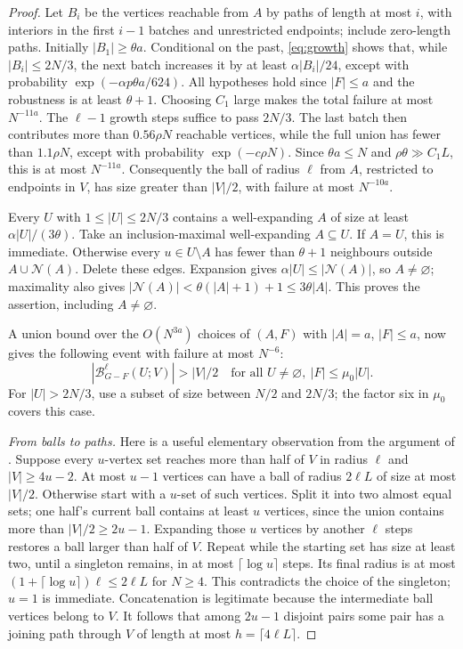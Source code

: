 \documentclass[11pt]{article}
\theoremstyle{remark}\newtheorem*{remark}{Remark}
\newcommand{\NN}{\mathcal N}
\begin{document}
\begin{proof}
Let $B_i$ be the vertices reachable from $A$ by paths of length at most
$i$, with interiors in the first $i-1$ batches and unrestricted endpoints;
include zero-length paths. Initially $|B_1|\ge\theta a$.
Conditional on the past, \eqref{eq:growth} shows that, while
$|B_i|\le2N/3$, the next batch increases it by at least
$\alpha|B_i|/24$, except with probability
$\exp(-\alpha p\theta a/624)$.
All hypotheses hold since $|F|\le a$ and the robustness is at least
$\theta+1$. Choosing $C_1$ large makes the total failure at most
$N^{-11a}$. The $\ell-1$ growth steps suffice to pass $2N/3$.
The last batch then contributes more than $0.56\rho N$ reachable
vertices, while the full union has fewer than $1.1\rho N$, except with
probability $\exp(-c\rho N)$. Since $\theta a\le N$ and
$\rho\theta\gg C_1L$, this is at most $N^{-11a}$.
Consequently the ball of radius $\ell$ from $A$, restricted to endpoints
in $V$, has size greater than $|V|/2$, with failure at most $N^{-10a}$.

Every $U$ with $1\le|U|\le2N/3$ contains a well-expanding
$A$ of size at least $\alpha|U|/(3\theta)$.
Take an inclusion-maximal well-expanding $A\subseteq U$. If $A=U$, this is immediate.
Otherwise every $u\in U\setminus A$ has fewer than $\theta+1$
neighbours outside $A\cup\NN(A)$. Delete these edges. Expansion gives
$\alpha|U|\le|\NN(A)|$, so $A\ne\varnothing$; maximality also gives
$|\NN(A)|<\theta(|A|+1)+1\le3\theta|A|$.
This proves the assertion, including $A\ne\varnothing$.

A union bound over the $O(N^{3a})$ choices of $(A,F)$ with
$|A|=a$, $|F|\le a$, now gives the following event with failure at most
$N^{-6}$:
\begin{equation}\label{eq:balls}
 |\mathcal B_{G-F}^{\ell}(U;V)|>|V|/2
 \quad\text{for all }U\ne\varnothing,\ |F|\le\mu_0|U|.
\end{equation}
For $|U|>2N/3$, use a subset of size between $N/2$ and $2N/3$;
the factor six in $\mu_0$ covers this case.

\emph{From balls to paths.}
Here is a useful elementary observation from the argument of \cite{BM}.
Suppose every $u$-vertex set reaches more than half of $V$ in radius
$\ell$ and $|V|\ge4u-2$. At most $u-1$ vertices can have a ball of
radius $2\ell L$ of size at most $|V|/2$. Otherwise start with a
$u$-set of such vertices. Split it into two almost equal sets; one
half's current ball contains at least $u$ vertices, since the union
contains more than $|V|/2\ge2u-1$. Expanding those $u$ vertices by
another $\ell$ steps restores a ball larger than half of $V$.
Repeat while the starting set has size at least two, until a singleton
remains, in at most $\lceil\log u\rceil$ steps. Its final radius is at most
$(1+\lceil\log u\rceil)\ell\le2\ell L$ for $N\ge4$.
This contradicts the choice of the singleton; $u=1$ is immediate. Concatenation is
legitimate because the intermediate ball vertices belong to $V$.
It follows that among $2u-1$ disjoint pairs some pair has a joining
path through $V$ of length at most $h=\lceil4\ell L\rceil$.


\end{proof}
\end{document}

